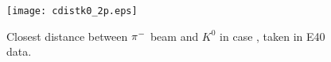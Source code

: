 \begin{figure}[!h]
  \begin{center}
    \texttt{[image: cdistk0\_2p.eps]}
    \caption{Closest distance between $\pi^{-}$ beam and $K^{0}$ in case , taken in E40 data.}
    \label{fig-cdistk0_2p}
  \end{center}
\end{figure}

\begin{comment}

\begin{figure}[!h]
  \begin{minipage}[t]{0.48\columnwidth}
    \centering
    \texttt{[image: cdistk0\_sim1.png]}
    \caption{Simulation of the distance of closest approach between the $\pM$ beam and reconstructed $\Kz$ tracks in case \rom{1}.}
    \label{fig-cdistk0_sim1}
  \end{minipage}
  \hspace{0.04\columnwidth} %
  \begin{minipage}[t]{0.48\columnwidth}
    \centering
    \texttt{[image: cdistk0\_sim2.png]}
    \caption{Simulation of the distance of closest approach between the $\pM$ beam and reconstructed $\Kz$ tracks in case \rom{2}.}
    \label{fig-cdistk0_sim2}
  \end{minipage}
\end{figure}

\begin{figure}[!h]
  \begin{minipage}[t]{0.48\columnwidth}
    \centering
    \texttt{[image: cdistk0\_1.png]}
    \caption{Distance of closest approach between the $\pM$ beam and reconstructed $\Kz$ tracks in case \rom{1}, taken in the E40 data.}
    \label{fig-cdistk0_1}
  \end{minipage}
  \hspace{0.04\columnwidth} %
  \begin{minipage}[t]{0.48\columnwidth}
    \centering
    \texttt{[image: cdistk0\_2.png]}
    \caption{Distance of closest approach between the $\pM$ beam and reconstructed $\Kz$ tracks in case \rom{2}, taken in the E40 data.}
    \label{fig-cdistk0_2}
  \end{minipage}
\end{figure}

\end{comment}

